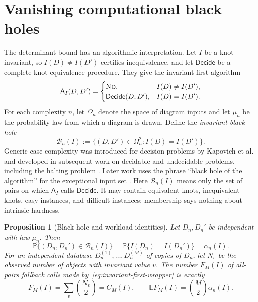 \documentclass[9pt,twoside]{pnas-new}
\newtheorem{proposition}[theorem]{Proposition}
\theoremstyle{definition}
\theoremstyle{remark}
\renewcommand{\Pr}{\mathbb{P}}
\begin{document}
\section{Vanishing computational black holes}
\label{sec:black-holes}
The determinant bound has an algorithmic interpretation. Let $I$ be a knot invariant, so $I(D)\ne I(D')$ certifies inequivalence, and let $\mathsf{Decide}$ be a complete knot-equivalence procedure. They give the invariant-first algorithm
\begin{equation}
 \mathsf A_I(D,D')=
 \begin{cases}
  \textsc{No},& I(D)\ne I(D'),\\
  \mathsf{Decide}(D,D'),& I(D)=I(D').
 \end{cases}
 \label{eq:invariant-first-wrapper}
\end{equation}
For each complexity $n$, let $\Omega_n$ denote the space of diagram inputs and let $\mu_n$ be the probability law from which a diagram is drawn.  Define the \emph{invariant black hole}
\begin{equation}
 \mathcal B_n(I):=
 \{(D,D')\in\Omega_n^2:I(D)=I(D')\}.
 \label{eq:black-hole-definition}
\end{equation}
Generic-case complexity was introduced for decision problems by Kapovich et al. and developed in subsequent work on decidable and undecidable problems, including the halting problem \cite{kapovichetal2003,gilmanetal2007,hamkinsmiasnikov2006,myasnikovrybalov2008}.  Later work uses the phrase ``black hole of the algorithm'' for the exceptional input set \cite{rybalov2013}.  Here $\mathcal B_n(I)$ means only the set of pairs on which $\mathsf A_I$ calls $\mathsf{Decide}$.  It may contain equivalent knots, inequivalent knots, easy instances, and difficult instances; membership says nothing about intrinsic hardness.

\begin{proposition}[Black-hole and workload identities]
\label{prop:black-hole-identity}
Let $D_n,D_n'$ be independent with law $\mu_n$.  Then
\begin{equation}
 \Pr\{(D_n,D_n')\in\mathcal B_n(I)\}
 =\Pr\{I(D_n)=I(D_n')\}
 =\alpha_n(I).
 \label{eq:black-hole-mass}
\end{equation}
For an independent database $D_n^{(1)},\ldots,D_n^{(M)}$ of copies of $D_n$, let $N_v$ be the observed number of objects with invariant value $v$.  The number $F_M(I)$ of all-pairs fallback calls made by~\eqref{eq:invariant-first-wrapper} is exactly
\begin{equation}
 F_M(I)
 =\sum_v\binom{N_v}{2}
 =C_M(I),
 \qquad
 \mathbb E F_M(I)=\binom M2\alpha_n(I).
 \label{eq:fallback-workload}
\end{equation}
\end{proposition}
\end{document}
